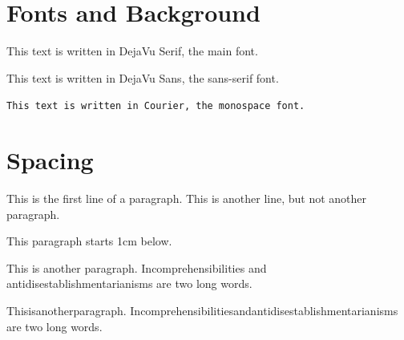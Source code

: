 \documentclass[12pt,a4paper]{article}
\begin{document}
	
	
	\section{Fonts and Background}
	
	\begin{trivlist}
		
		\item This text is written in DejaVu Serif, the main font.
		
		\item \textsf{This text is written in DejaVu Sans, the sans-serif font.}
		
		\item \texttt{This text is written in Courier, the monospace font.}
		
	\end{trivlist}
	
	
	
	\section{Spacing}
	
	This is the first line of a paragraph.
	This is another line, but not another paragraph.
	
	\vspace{1cm}
	
	This paragraph starts 1cm below.
	
	\vspace{0.5cm}
	
	This is another paragraph.
	Incomprehensibilities and antidisestablishmentarianisms
	are two long words.
	
	\vspace{0.5cm}
	
	\begin{samepage}
		
		Thisisanotherparagraph.
		Incomprehensibilitiesandantidisestablishmentarianisms
		are two long words.
	\end{samepage}
	
	\newpage
	\vspace*{5cm}
	
	
	\setcounter{section}{3}
	
\end{document}
